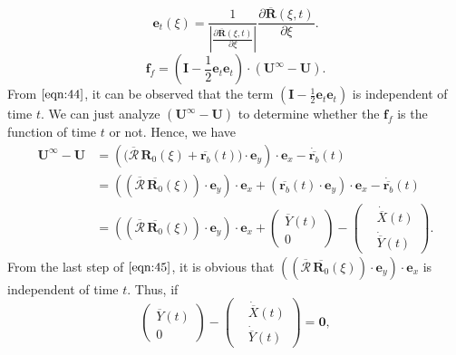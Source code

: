 \documentclass[a4paper,12pt]{report}
\begin{document}
\begin{equation}
	\label{eqn:43}
	\mathbf{e}_t(\xi)=\frac{1}{|\frac{\partial\overline{\mathbf{R}}(\xi,t)}{\partial\xi}|}\frac{\partial\overline{\mathbf{R}}(\xi,t)}{\partial\xi}.
\end{equation}
\begin{equation}
	\label{eqn:44}
	\mathbf{f}_{f}=\left(\mathbf{I}-\frac{1}{2}\mathbf{e}_t\mathbf{e}_t\right)\cdot(\mathbf{U}^{\infty}-\mathbf{U}).
\end{equation}
From $\eqref{eqn:44}$, it can be observed that the term $\left(\mathbf{I}-\frac{1}{2}\mathbf{e}_t\mathbf{e}_t\right)$ is independent of time $t$. We can just analyze $(\mathbf{U}^{\infty}-\mathbf{U})$ to determine whether the $\mathbf{f}_{f}$ is the function of time $t$ or not. Hence, we have 
\begin{equation}
	\label{eqn:45}
	\begin{aligned}
		\mathbf{U}^{\infty}-\mathbf{U}&=\left(\Big(\overline{\mathbf{\mathcal{R}}}\,\mathbf{R}_0(\xi)+\overline{\mathbf{r}_b}(t)\Big)\cdot\mathbf{e}_y\right)\cdot\mathbf{e}_x-\dot{\overline{\mathbf{r}_b}}(t)\\
		&=\left((\overline{\mathbf{\mathcal{R}}}\,\overline{\mathbf{R}_0}(\xi))\cdot\mathbf{e}_y\right)\cdot\mathbf{e}_x+(\overline{\mathbf{r}_b}(t)\cdot\mathbf{e}_y)\cdot\mathbf{e}_x-\dot{\overline{\mathbf{r}_b}}(t)\\
		&=\left((\overline{\mathbf{\mathcal{R}}}\,\overline{\mathbf{R}_0}(\xi))\cdot\mathbf{e}_y\right)\cdot\mathbf{e}_x+\left(\begin{aligned}
			\overline{Y}(t)\\
			0
		\end{aligned}\right)-\left(\begin{aligned}
			&\dot{\overline{X}}(t) \\
			&\dot{\overline{Y}}(t)
		\end{aligned}\right).
	\end{aligned}
\end{equation}
From the last step of $\eqref{eqn:45}$, it is obvious that $\left((\overline{\mathbf{\mathcal{R}}}\,\overline{\mathbf{R}_0}(\xi))\cdot\mathbf{e}_y\right)\cdot\mathbf{e}_x$ is independent of time $t$. Thus, if 
\begin{equation}
	\label{eqn:46}
	\left(\begin{aligned}
		\overline{Y}(t)\\
		0
	\end{aligned}\right)-\left(\begin{aligned}
		&\dot{\overline{X}}(t) \\
	    &\dot{\overline{Y}}(t)
	\end{aligned}\right)=\mathbf{0},
\end{equation}
\end{document}
